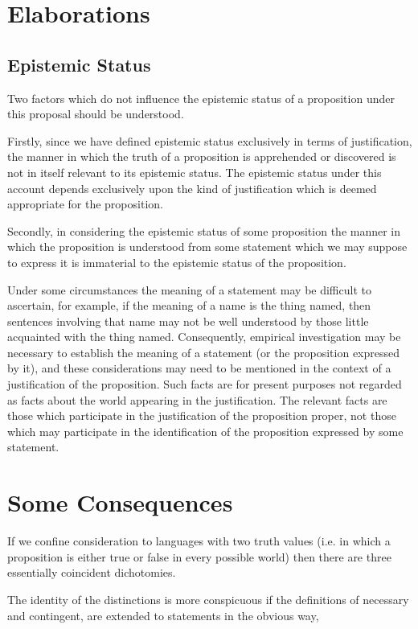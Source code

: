 {\section{Elaborations}

\subsection{Epistemic Status}

Two factors which do not influence the epistemic status of a proposition under this proposal should be understood.

Firstly, since we have defined epistemic status exclusively in terms of justification, the manner in which the truth of a proposition is apprehended or discovered is not in itself relevant to its epistemic status.
The epistemic status under this account depends exclusively upon the kind of justification which is deemed appropriate for the proposition.

Secondly, in considering the epistemic status of some proposition the manner in which the proposition is understood from some statement which we may suppose to express it is immaterial to the epistemic status of the proposition.

Under some circumstances the meaning of a statement may be difficult to ascertain, for example, if the meaning of a name is the thing named, then sentences involving that name may not be well understood by those little acquainted with the thing named.
Consequently, empirical investigation may be necessary to establish the meaning of a statement (or the proposition expressed by it), and these considerations may need to be mentioned in the context of a justification of the proposition.
Such facts are for present purposes not regarded as facts about the world appearing in the justification.
The relevant facts are those which participate in the justification of the proposition proper, not those which may participate in the identification of the proposition expressed by some statement.

\section{Some Consequences}

If we confine consideration to languages with two truth values (i.e.
in which a proposition is either true or false in every possible world)
then there are three essentially coincident dichotomies.

The identity of the distinctions is more conspicuous if the definitions
of necessary and contingent, are extended to statements in the obvious
way,

}%
